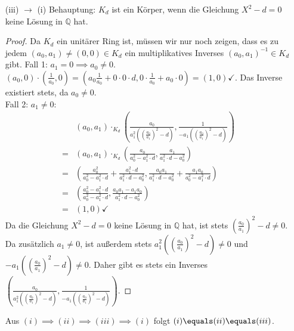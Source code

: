 \documentclass{article}
\begin{document}
\begin{enumerate}[a)]
\begin{itemize}
\begin{proof}
\begin{align*}
				\intertext{Nach unserer Wahl von $a_0, a_1$ gilt $\left(\frac{a_0}{a_1}\right)^2 - d = 0$.}
				=&\left(b\frac{a_1^2}{a_0} \left(0\right), 0\right) = (0,0)
			\end{align*}
		\end{proof}
		$a_1\implies (a_0, a_1) \neq (0,0)$ und $b\neq 0 \implies \left(b, -\frac{a_1}{a_0} b\right) \neq (0,0)$. Es gibt also $a,b\in K_d\setminus\{0_{K_d}\}$ mit $a\cdot b = 0_{K_d}$. Damit ist die Kontraposition $\neg (iii) \to \neg (ii)$ und somit auch die Implikation $(ii) \to (iii)$ bewiesen.
		\item[(iii) $\to$ (i)] Behauptung: $K_d$ ist ein Körper, wenn die Gleichung $X^2-d = 0$ keine Lösung in $\mathbb{Q}$ hat. 
		\begin{proof}
			Da $K_d$ ein unitärer Ring ist, müssen wir nur noch zeigen, dass es zu jedem $(a_0, a_1) \neq (0,0) \in K_d$ ein multiplikatives Inverses $(a_0, a_1)^{-1} \in K_d$ gibt.
			Fall 1: $a_1 = 0\implies a_0\neq 0$. $(a_0, 0) \cdot\left(\frac{1}{a_0}, 0\right) = \left(a_0\frac{1}{a_0} + 0\cdot 0\cdot d, 0\cdot \frac{1}{a_0} + a_0\cdot 0 \right) = (1, 0)\checkmark $. Das Inverse existiert stets, da $a_0\neq 0$.\\
			Fall 2: $a_1\neq 0$: 
			\begin{align*}
				&(a_0, a_1)\cdot_{K_d}\left(\frac{a_0}{a_1^2\left(\left(\frac{a_0}{a_1}\right)^2-d\right)}, \frac{1}{-a_1\left(\left(\frac{a_0}{a_1}\right)^2-d\right)}\right)\\
				=&(a_0, a_1)\cdot_{K_d}\left(\frac{a_0}{a_0^2-a_1^2\cdot d}, \frac{a_1}{a_1^2\cdot d - a_0^2}\right)\\
				=&\left(\frac{a_0^2}{a_0^2-a_1^2\cdot d} +\frac{a_1^2\cdot d}{a_1^2\cdot d - a_0^2}, \frac{a_0a_1}{a_1^2\cdot d - a_0^2} + \frac{a_1a_0}{a_0^2-a_1^2\cdot d}\right)\\
				=&\left(\frac{a_0^2 - a_1^2\cdot d}{a_0^2-a_1^2\cdot d}, \frac{a_0a_1 -a_1a_0}{a_1^2\cdot d - a_0^2}\right)\\
				=&(1,0)\checkmark
			\end{align*}
			Da die Gleichung $X^2-d = 0$ keine Lösung in $\mathbb{Q}$ hat, ist stets  $\left(\frac{a_0}{a_1}\right)^2-d \neq 0$. Da zusätzlich $a_1\neq 0$, ist außerdem stets $a_1^2\left(\left(\frac{a_0}{a_1}\right)^2-d\right) \neq 0$ und $-a_1\left(\left(\frac{a_0}{a_1}\right)^2-d\right)\neq 0$.
			Daher gibt es stets ein Inverses $\left(\frac{a_0}{a_1^2\left(\left(\frac{a_0}{a_1}\right)^2-d\right)}, \frac{1}{-a_1\left(\left(\frac{a_0}{a_1}\right)^2-d\right)}\right)$.
		\end{proof}
	Aus $(i)\implies (ii)\implies (iii) \implies (i)$ folgt $(i)\equals (ii)\equals (iii)$.
	\end{itemize}
	\end{enumerate}
\end{document}

